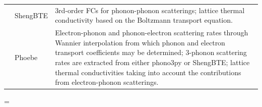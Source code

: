 \begin{longtable}{p{3cm}p{3cm}p{11cm}}
& 
\footnotesize{ShengBTE\cite{li2014shengbte}}
&\footnotesize{3rd-order FCs for phonon-phonon scatterings; lattice thermal conductivity based on the Boltzmann transport equation. }\\


& 
\footnotesize{Phoebe\cite{cepellotti2022phoebe}}
&\footnotesize{Electron-phonon and phonon-electron scattering rates through Wannier interpolation from which phonon and electron transport coefficients may be determined; 3-phonon scattering rates are extracted from either phono3py or ShengBTE; lattice thermal conductivities taking into account the contributions from electron-phonon scatterings. }\\
\end{longtable}
\endgroup


\begingroup %
\renewcommand{\arraystretch}{1.2}  
\LTcapwidth=\textwidth

